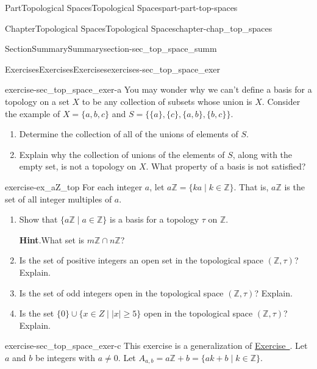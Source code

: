 \documentclass[oneside,10pt,]{book}
\newcommand{\blocktitlefont}{\relax}
\newcommand{\xreffont}{\relax}
\numberwithin{equation}{chapter}
\newcommand{\Z}{\mathbb{Z}}
\begin{document}
\begin{partptx}{Part}{Topological Spaces}{}{Topological Spaces}{}{}{part-part-top-spaces}
\begin{chapterptx}{Chapter}{Topological Spaces}{}{Topological Spaces}{}{}{chapter-chap_top_spaces}
\begin{sectionptx}{Section}{Summary}{}{Summary}{}{}{section-sec_top_space_summ}
%
\end{sectionptx}
%
%
\typeout{************************************************}
\typeout{************************************************}
%
\begin{exercises-section}{Exercises}{Exercises}{}{Exercises}{}{}{exercises-sec_top_space_exer}
\begin{divisionexercise}{1}{}{}{exercise-sec_top_space_exer-a}%
You may wonder why we can't define a basis for a topology on a set \(X\) to be any collection of subsets whose union is \(X\). Consider the example of \(X = \{a,b,c\}\) and \(S = \{\{a\}, \{c\}, \{a,b\}, \{b,c\}\}\).%
\begin{enumerate}[font=\bfseries,label=(\alph*),ref=\alph*]%
\item{}Determine the collection of all of the unions of elements of \(S\).%
\item{}Explain why the collection of unions of the elements of \(S\), along with the empty set, is not a topology on \(X\). What property of a basis is not satisfied?%
\end{enumerate}%
\end{divisionexercise}%
\begin{divisionexercise}{2}{}{}{exercise-ex_aZ_top}%
For each integer \(a\), let \(a\Z = \{ka \mid k \in \Z\}\). That is, \(a\Z\) is the set of all integer multiples of \(a\).%
\begin{enumerate}[font=\bfseries,label=(\alph*),ref=\alph*]%
\item{}Show that \(\{a\Z \mid a \in \Z\}\) is a basis for a topology \(\tau\) on \(\Z\).%
\par\smallskip%
\noindent\textbf{\blocktitlefont Hint}.\hypertarget{hint-ex_aZ_top-b-b}{}\quad{}What set is \(m\Z \cap n\Z\)?%
\item{}Is the set of positive integers an open set in the topological space \((\Z, \tau)\)? Explain.%
\item{}Is the set of odd integers open in the topological space \((\Z, \tau)\)? Explain.%
\item{}Is the set \(\{0\} \cup \{x \in Z \mid |x| \geq 5\}\) open in the topological space \((\Z, \tau)\)? Explain.%
\end{enumerate}%
\end{divisionexercise}%
\begin{divisionexercise}{3}{}{}{exercise-sec_top_space_exer-c}%
This exercise is a generalization of \hyperlink{exercise-ex_aZ_top}{Exercise~{\xreffont 2}}. Let \(a\) and \(b\) be integers with \(a \neq 0\). Let \(A_{a,b} = a\Z+b = \{ak + b \mid k \in \Z\}\).%

\end{divisionexercise}
\end{exercises-section}
\end{chapterptx}
\end{partptx}
\end{document}

